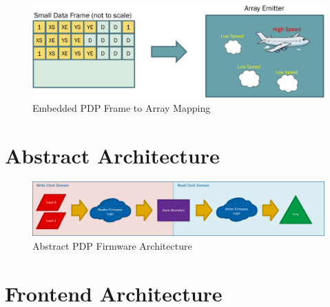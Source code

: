     \begin{figure}
        \centering
        \includegraphics[width=1.0\textwidth]{fig/embedded_frame_to_emitter.pdf}
        \caption{Embedded PDP Frame to Array Mapping}
        \label{fig:embedded_frame_to_emitter}
    \end{figure}

\section{Abstract Architecture}
    \begin{figure}
        \centering
        \includegraphics[width=1.0\textwidth]{fig/abstract_architecture.pdf}
        \caption{Abstract PDP Firmware Architecture}
        \label{fig:abstract_architecture}
    \end{figure}

\section{Frontend Architecture}
    \label{sec:frontend_arch}

